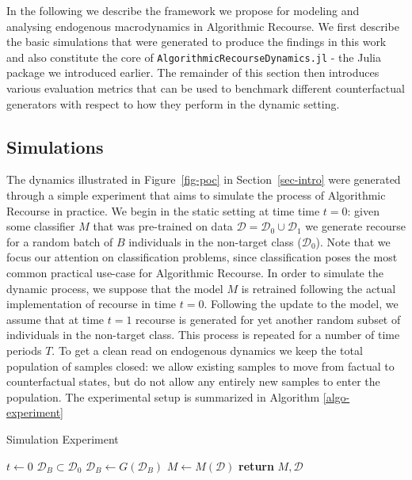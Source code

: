 \documentclass[
  conference]{IEEEtran}
\begin{document}
In the following we describe the framework we propose for modeling and
analysing endogenous macrodynamics in Algorithmic Recourse. We first
describe the basic simulations that were generated to produce the
findings in this work and also constitute the core of
\texttt{AlgorithmicRecourseDynamics.jl} - the Julia package we
introduced earlier. The remainder of this section then introduces
various evaluation metrics that can be used to benchmark different
counterfactual generators with respect to how they perform in the
dynamic setting.

\hypertarget{sec-method-2-experiment}{%
\subsection{Simulations}\label{sec-method-2-experiment}}

The dynamics illustrated in Figure~\ref{fig-poc} in
Section~\ref{sec-intro} were generated through a simple experiment that
aims to simulate the process of Algorithmic Recourse in practice. We
begin in the static setting at time time \(t=0\): given some classifier
\(M\) that was pre-trained on data
\(\mathcal{D}=\mathcal{D}_0 \cup \mathcal{D}_1\) we generate recourse
for a random batch of \(B\) individuals in the non-target class
(\(\mathcal{D}_0\)). Note that we focus our attention on classification
problems, since classification poses the most common practical use-case
for Algorithmic Recourse. In order to simulate the dynamic process, we
suppose that the model \(M\) is retrained following the actual
implementation of recourse in time \(t=0\). Following the update to the
model, we assume that at time \(t=1\) recourse is generated for yet
another random subset of individuals in the non-target class. This
process is repeated for a number of time periods \(T\). To get a clean
read on endogenous dynamics we keep the total population of samples
closed: we allow existing samples to move from factual to counterfactual
states, but do not allow any entirely new samples to enter the
population. The experimental setup is summarized in Algorithm
\ref{algo-experiment}

\begin{algorithm}
\caption{Simulation Experiment}\label{algo-experiment}
\begin{algorithmic}[1]
\State $t\gets 0$
\State $\mathcal{D}_B \subset \mathcal{D}_0$ 
\State $\mathcal{D}_B\gets G(\mathcal{D}_B)$ 
\State $M\gets M(\mathcal{D})$ 
\EndWhile
\State \textbf{return} $M,\mathcal{D}$
\EndProcedure
\end{algorithmic}
\end{algorithm}
\end{document}
